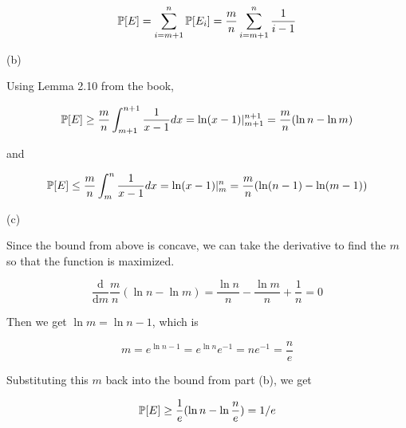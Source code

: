 \begin{equation*}
\begin{split}
\P[E] = \sum_{i=m+1}^{n} \P[E_i] = \frac{m}{n}\sum_{i=m+1}^{n}\frac{1}{i-1}
\end{split}
\end{equation*}

(b)

Using Lemma 2.10 from the book,

\begin{equation*}
	\P[E] \geq \frac{m}{n}\int_{m+1}^{n+1}\frac{1}{x-1}dx = 
	\ln(x-1)|_{m+1}^{n+1} = \frac{m}{n}(\ln n - \ln m)
\end{equation*}

and

\begin{equation*}
\P[E] \leq \frac{m}{n}\int_{m}^{n}\frac{1}{x-1}dx = 
\ln(x-1)|_{m}^{n} = \frac{m}{n}(\ln (n-1) - \ln (m-1))
\end{equation*}


(c)

Since the bound from above is concave, we can take the derivative to find the $m$
so that the function is maximized. 

\begin{equation*}
\frac{\mathrm{d}}{\mathrm{d} m}\frac{m}{n}(\ln n - \ln m) = \frac{\ln n}{n} - \frac{\ln m}{n} + \frac{1}{n} = 0
\end{equation*}

Then we get $\ln m = \ln n - 1$, which is 

\begin{equation*}
m = e^{\ln n -1} = e^{\ln n}e^{-1} = ne^{-1} = \frac{n}{e}
\end{equation*}

Substituting this $m$ back into the bound from part (b), we get

\begin{equation*}
\P[E] \geq \frac{1}{e} (\ln n - \ln \frac{n}{e}) = 1/e
\end{equation*}































